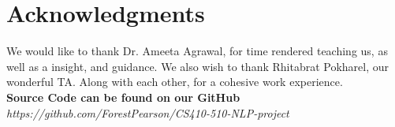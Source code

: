 \documentclass[11pt,a4paper]{article}
\begin{document}
\section*{Acknowledgments}

We would like to thank Dr. Ameeta Agrawal, for time rendered teaching us, as well as a insight, and guidance. We also wish to thank Rhitabrat Pokharel, our wonderful TA. Along with each other, for a cohesive work experience. \\

\textbf{Source Code can be found on our GitHub\cite{pearson_cs410-510-nlp-project_2022}}\\
\textit{https://github.com/ForestPearson/CS410-510-NLP-project}

\nocite{*} 
\printbibliography[title={Bibliography}] 

%
%

\end{document}
